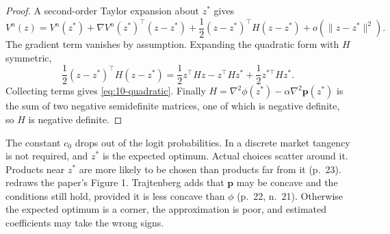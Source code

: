 \begin{proof}
A second-order Taylor expansion about $z^*$ gives
\begin{equation*}
V^n(z) = V^n(z^*) + \nabla V^n(z^*)^\top(z - z^*) + \frac{1}{2}(z - z^*)^\top H(z - z^*) + o\left(\|z - z^*\|^2\right).
\end{equation*}
The gradient term vanishes by assumption. Expanding the quadratic form with $H$ symmetric,
\begin{equation*}
\frac{1}{2}(z - z^*)^\top H(z - z^*) = \frac{1}{2}z^\top Hz - z^\top Hz^* + \frac{1}{2}z^{*\top}Hz^* .
\end{equation*}
Collecting terms gives \eqref{eq:10-quadratic}. Finally $H = \nabla^2\phi(z^*) - \alpha\nabla^2\mathbf{p}(z^*)$ is
the sum of two negative semidefinite matrices, one of which is negative definite, so $H$ is negative definite.
\end{proof}

The constant $c_0$ drops out of the logit probabilities. In a discrete market tangency is not required, and $z^*$ is
the expected optimum. Actual choices scatter around it. Products near $z^*$ are more likely to be chosen than products far
from it (p.~23).  redraws the paper's Figure 1. Trajtenberg adds that $\mathbf{p}$
may be concave and the conditions still hold, provided it is less concave than $\phi$ (p.~22, n.~21). Otherwise the
expected optimum is a corner, the approximation is poor, and estimated coefficients may take the wrong signs.

